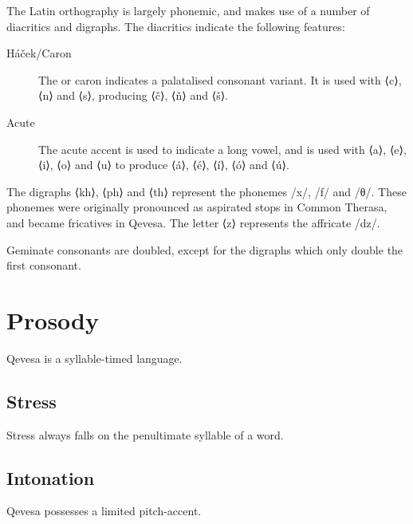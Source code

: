 \documentclass[grammar]{subfiles}
\begin{document}
  The Latin orthography is largely phonemic, and makes use of a number of
  diacritics and digraphs.  The diacritics indicate the following features:

  \begin{description}
    \item[Háček/Caron] The  or caron indicates a palatalised
      consonant variant.  It is used with ⟨c⟩, ⟨n⟩ and ⟨s⟩, producing ⟨č⟩, ⟨ň⟩
      and ⟨š⟩.  
    \item[Acute] The acute accent is used to indicate a long vowel, and is used
      with ⟨a⟩, ⟨e⟩, ⟨i⟩, ⟨o⟩ and ⟨u⟩ to produce ⟨á⟩, ⟨é⟩, ⟨í⟩, ⟨ó⟩ and ⟨ú⟩.  
  \end{description}

  The digraphs ⟨kh⟩, ⟨ph⟩ and ⟨th⟩ represent the phonemes /x/, /f/ and /θ/.
  These phonemes were originally pronounced as aspirated stops in Common
  Therasa, and became fricatives in Qevesa. The letter ⟨z⟩ represents the
  affricate /dz/.

  Geminate consonants are doubled, except for the digraphs which only double
  the first consonant.  



  \section{Prosody}
  \label{sec:prosody}

  Qevesa is a syllable-timed language.
  \ToBeWritten

  \subsection{Stress}
  \label{ssec:stress}

  Stress always falls on the penultimate syllable of a word. 
  \ToBeWritten

  \subsection{Intonation}
  \label{ssec:intonation}

  Qevesa possesses a limited pitch-accent.
  \ToBeWritten
\end{document}
